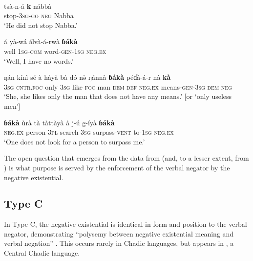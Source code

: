 \documentclass[output=paper,draft,draftmode,colorlinks,citecolor=brown]{langscibook}
\begin{document}
\ea\label{ex:wandala-stop-words-means-surpass}
\\ 

\ea\label{ex:wandala-stop}

\gll tsà-n-á \textbf{k} nábbà\\
stop-3\textsc{sg-go} \textsc{neg} Nabba\\ 

\glt `He did not stop Nabba.'
\ex\label{ex:wandala-words}

\gll á yà-wá \'əlvà-á-rwà \textbf{ɓákà}\\
well 1\textsc{sg-com} word-\textsc{gen-1sg} \textsc{neg.ex}\\

\glt `Well, I have no words.'
\ex\label{ex:wandala-means}

\gll ŋán kín{ì} sé à hàyà bà dó n\`ə ŋánnà \textbf{ɓákà} péɗà-á-r nà \textbf{kà}\\
3\textsc{sg} \textsc{cntr.foc} only 3\textsc{sg} like \textsc{foc} man \textsc{dem} \textsc{def} \textsc{neg.ex} means-\textsc{gen-3sg} \textsc{dem} \textsc{neg}\\

\glt `She, she likes only the man that does not have any means.' [or `only useless men']
\ex\label{ex:wandala-surpass}

\gll \textbf{ɓákà} ùrà tà tàttàyà à j-\'u g-íyà \textbf{ɓákà}\\
\textsc{neg.ex} person 3\textsc{pl} search 3\textsc{sg} surpass-\textsc{vent} to-\textsc{1sg} \textsc{neg.ex}\\

\glt `One does not look for a person to surpass me.'

\z
\z

The open question that emerges from the data from  (and, to a lesser extent, from ) is what purpose is served by the enforcement of the verbal negator by the negative existential.

\subsection{Type C}\label{sec:3:3.5}

In Type C, the negative existential is identical in form and position to the verbal negator, demonstrating ``polysemy between negative existential meaning and verbal negation'' \citep[12]{Croft1991}. This occurs rarely in Chadic languages, but appears in , a Central Chadic language. 
\end{document}
